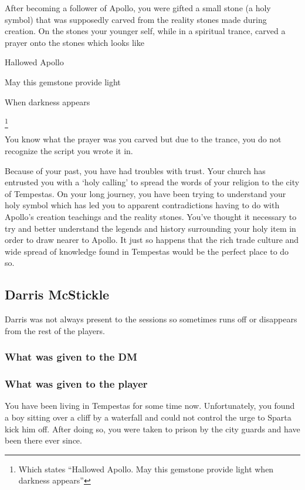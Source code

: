 After becoming a follower of Apollo, you were gifted a small stone (a holy symbol) that was supposedly carved from the reality stones made during creation. On the stones your younger self, while in a spiritual trance, carved a prayer onto the stones which looks like

\begin{center}
	{\Large {} 
	Hallowed Apollo
	
	May this gemstone provide light
	
	When darkness appears
	}\footnote{Which states ``Hallowed Apollo. May this gemstone provide light when darkness appears''}
\end{center}

You know what the prayer was you carved but due to the trance, you do not recognize the script you wrote it in.

Because of your past, you have had troubles with trust. Your church has entrusted you with a `holy calling' to spread the words of your religion to the city of Tempestas. On your long journey, you have been trying to understand your holy symbol which has led you to apparent contradictions having to do with Apollo's creation teachings and the reality stones. You've thought it necessary to try and better understand the legends and history surrounding your holy item in order to draw nearer to Apollo. It just so happens that the rich trade culture and wide spread of knowledge found in Tempestas would be the perfect place to do so.

\subsection{Darris McStickle}

Darris was not always present to the sessions so sometimes runs off or disappears from the rest of the players.

\subsubsection{What was given to the DM}



\subsubsection{What was given to the player}

You have been living in Tempestas for some time now. Unfortunately, you found a boy sitting over a cliff by a waterfall and could not control the urge to Sparta kick him off. After doing so, you were taken to prison by the city guards and have been there ever since.

